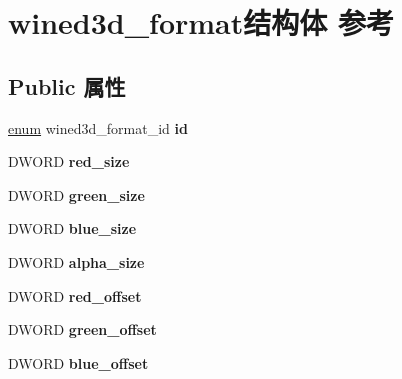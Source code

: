 \hypertarget{structwined3d__format}{}\section{wined3d\+\_\+format结构体 参考}
\label{structwined3d__format}
\subsection*{Public 属性}
\begin{DoxyCompactItemize}
\item 
\mbox{\label{structwined3d__format_a8113c6d079ee424f38eb5d0c7fae5f09}} 
\hyperlink{interfaceenum}{enum} wined3d\+\_\+format\+\_\+id {\bfseries id}
\item 
\mbox{\label{structwined3d__format_ad17341c6e4b12badc2c3fb58eaeec580}} 
D\+W\+O\+RD {\bfseries red\+\_\+size}
\item 
\mbox{\label{structwined3d__format_accda8105c47514e4a7afd16bbbb8a4b0}} 
D\+W\+O\+RD {\bfseries green\+\_\+size}
\item 
\mbox{\label{structwined3d__format_ad4638c0f65e3b19d5c6b618643ad3e06}} 
D\+W\+O\+RD {\bfseries blue\+\_\+size}
\item 
\mbox{\label{structwined3d__format_a02f9950b68811fcdd85308572bba4f3a}} 
D\+W\+O\+RD {\bfseries alpha\+\_\+size}
\item 
\mbox{\label{structwined3d__format_a953854e03ab9de3168460d33d0235657}} 
D\+W\+O\+RD {\bfseries red\+\_\+offset}
\item 
\mbox{\label{structwined3d__format_acbcc08783e4f6fa8f626e5688390f1ea}} 
D\+W\+O\+RD {\bfseries green\+\_\+offset}
\item 
\mbox{\label{structwined3d__format_a54a73a9ac1b2aa649789be10f31b6a68}} 
D\+W\+O\+RD {\bfseries blue\+\_\+offset}
\item 
\mbox{\label{structwined3d__format_a8a6e85dc267ea7823212690583318eba}} 

\end{DoxyCompactItemize}
